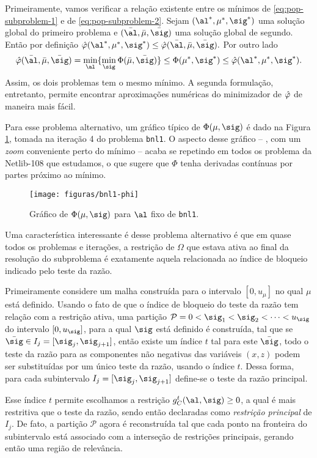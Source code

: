 Primeiramente, vamos verificar a relação existente entre os mínimos de \eqref{eq:pop-subproblem-1} e de \eqref{eq:pop-subproblem-2}. Sejam $(\al^*,\mu^*,\sig^*)$ uma solução global do  primeiro problema e $(\bar{\al}, \bar{\mu},\bar{\sig})$ uma solução global de segundo. Então por definição
$ \nextphi(\al^*,\mu^*,\sig^*) \leq \nextphi (\bar{\al},\bar{\mu},\bar{\sig}).$
Por outro lado 
\[
\nextphi(\baral,\barmu,\barsig) = \min_{\al}\{ \min_{\sig}\Phi(\barmu,\barsig)\} \leq \Phi(\mu^{*},\sig^{*}) \leq \nextphi(\al^*,\mu^*,\sig^*).
\]
Assim, os dois problemas tem o mesmo mínimo. A segunda formulação, entretanto, permite encontrar aproximações numéricas do minimizador de $\hat{\varphi}$ de maneira mais fácil. 

Para esse problema alternativo, um gráfico típico de $\Phi(\mu,\sig)$ é dado na Figura \ref{fig:bnl1-Phi}, tomada na iteração \num{4} do problema \texttt{bnl1}. O aspecto desse gráfico -- , com um \emph{zoom} conveniente perto do mínimo --  acaba se repetindo  em todos os problema da Netlib-108 que estudamos, o que sugere que $\Phi$ tenha derivadas contínuas por partes próximo ao mínimo.

\begin{figure}[htbp]
\centering
\texttt{[image: figuras/bnl1-phi]}
  	\caption{\label{fig:bnl1-Phi} Gráfico de $\Phi(\mu,\sig)$ para $\al$ fixo de \texttt{bnl1}.}
  \end{figure}

 Uma característica interessante é desse problema alternativo é que em quase todos os problemas e iterações, a restrição de $\Omega$ que estava ativa ao final da resolução do subproblema é exatamente aquela relacionada ao índice de bloqueio indicado pelo teste da razão.

Primeiramente considere  um malha construída para o intervalo $[0,u_{\mu}]$ no qual  $\mu$ está definido. Usando o fato de que o índice de bloqueio do teste da razão tem relação com a restrição ativa, uma partição $\mathcal{P} = 0<\sig_{1}<\sig_{2}<\cdots<u_{\sig}$ do intervalo $[0,u_{\sig}]$, para  a  qual $\sig$ está definido é construída, tal que se $\barsig\in I_{j} = [\sig_{j},\sig_{j+1}]$, então existe um índice $t$ tal para este $\barsig$, todo o teste da razão para as componentes não negativas das variáveis $(x,z)$ podem ser substituídas por um único teste da razão, usando o índice $t$. Dessa forma, para cada subintervalo $I_{j} = [\sig_{j},\sig_{j+1}]$ define-se o teste da razão principal. 

Esse índice $t$ permite escolhamos a restrição $g_{C}^{t}(\al,\sig)\geq0$, a qual é mais restritiva que o teste da razão,   sendo  então declaradas como \emph{restrição principal}  de $I_{j}$. De fato, a partição $\mathcal{P}$ agora é reconstruída tal que cada ponto na fronteira do subintervalo está associado com a interseção de restrições principais, gerando então uma região de relevância.

